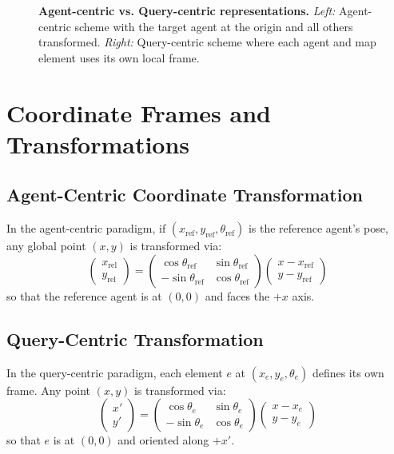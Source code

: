 \begin{figure}[t]
\centering
\caption[Agent-centric vs. Query-centric Frames]{\textbf{Agent-centric vs. Query-centric representations.} \emph{Left:} Agent-centric scheme with the target agent at the origin and all others transformed. \emph{Right:} Query-centric scheme where each agent and map element uses its own local frame.}
\label{fig:agent_vs_query}
\end{figure}

\section{Coordinate Frames and Transformations}
\subsection{Agent-Centric Coordinate Transformation}
In the agent-centric paradigm, if $(x_{\text{ref}}, y_{\text{ref}}, \theta_{\text{ref}})$ is the reference agent's pose, any global point $(x, y)$ is transformed via:
\begin{equation}
\label{eq:agent_centric_transform}
\begin{pmatrix}
    x_{\text{rel}} \\ y_{\text{rel}}
\end{pmatrix}
=
\begin{pmatrix}
    \cos\theta_{\text{ref}} & \sin\theta_{\text{ref}} \\
    -\sin\theta_{\text{ref}} & \cos\theta_{\text{ref}}
\end{pmatrix}
\begin{pmatrix}
    x - x_{\text{ref}} \\ y - y_{\text{ref}}
\end{pmatrix}
\end{equation}
so that the reference agent is at $(0,0)$ and faces the $+x$ axis.

\subsection{Query-Centric Transformation}
In the query-centric paradigm, each element $e$ at $(x_e, y_e, \theta_e)$ defines its own frame. Any point $(x, y)$ is transformed via:
\begin{equation}
\label{eq:query_frame_transform}
\begin{pmatrix}
    x' \\ y'
\end{pmatrix}
=
\begin{pmatrix}
    \cos\theta_e & \sin\theta_e \\
    -\sin\theta_e & \cos\theta_e
\end{pmatrix}
\begin{pmatrix}
    x - x_e \\ y - y_e
\end{pmatrix}
\end{equation}
so that $e$ is at $(0,0)$ and oriented along $+x'$.

